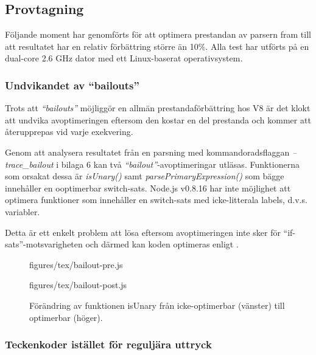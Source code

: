 \subsection{Provtagning}

Följande moment har genomförts för att optimera prestandan av parsern fram
till att resultatet har en relativ förbättring större än 10\%. Alla test har
utförts på en dual-core 2.6 GHz dator med ett Linux-baserat operativsystem.

\subsubsection{Undvikandet av ``bailouts''}

Trots att \textit{``bailouts''} möjliggör en allmän prestandaförbättring hos
V8 är det klokt att undvika avoptimeringen eftersom den kostar en del
prestanda och kommer att återupprepas vid varje exekvering.

Genom att analysera resultatet från en parsning med kommandoradsflaggan
\textit{--trace_bailout} i bilaga 6 kan två
\textit{``bailout''}-avoptimeringar utläsas.  Funktionerna som orsakat dessa
är \textit{isUnary()} samt \textit{parsePrimaryExpression()} som bägge
innehåller en ooptimerbar switch-sats. \mbox{Node.js} v0.8.16 har inte
möjlighet att optimera funktioner som innehåller en switch-sats med
icke-litterala labels, d.v.s. variabler.

Detta är ett enkelt problem att lösa eftersom avoptimeringen inte sker för
``if-sats''-motsvarigheten och därmed kan koden optimeras enligt
.

\begin{figure}[ht]
  \begin{minipage}[t]{0.5\textwidth}
      {figures/tex/bailout-pre.js}
  \end{minipage}%
  \begin{minipage}[t]{0.5\textwidth}
      {figures/tex/bailout-post.js}
  \end{minipage}
  \caption{Förändring av funktionen isUnary från icke-optimerbar (vänster) till
    optimerbar (höger).}
  \label{fig:bailout}
\end{figure}

\subsubsection{Teckenkoder istället för reguljära uttryck}

